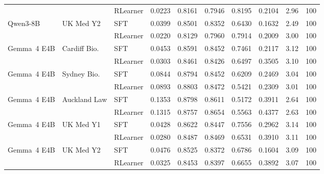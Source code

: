 \begin{table}[h]
{\begin{tabular}{lllccccccc}
 &  & RLearner & 0.0223 & 0.8161 & 0.7946 & 0.8195 & 0.2104 & 2.96 & 100 \\
Qwen3-8B & UK Med Y2 & SFT & 0.0399 & 0.8501 & 0.8352 & 0.6430 & 0.1632 & 2.49 & 100 \\
 &  & RLearner & 0.0220 & 0.8129 & 0.7960 & 0.7914 & 0.2009 & 3.00 & 100 \\
\midrule
Gemma~4 E4B & Cardiff Bio. & SFT & 0.0453 & 0.8591 & 0.8452 & 0.7461 & 0.2117 & 3.12 & 100 \\
 &  & RLearner & 0.0303 & 0.8461 & 0.8426 & 0.6497 & 0.3505 & 3.10 & 100 \\
Gemma~4 E4B & Sydney Bio. & SFT & 0.0844 & 0.8794 & 0.8452 & 0.6209 & 0.2469 & 3.04 & 100 \\
 &  & RLearner & 0.0893 & 0.8803 & 0.8472 & 0.5421 & 0.2309 & 3.01 & 100 \\
Gemma~4 E4B & Auckland Law & SFT & 0.1353 & 0.8798 & 0.8611 & 0.5172 & 0.3911 & 2.64 & 100 \\
 &  & RLearner & 0.1315 & 0.8757 & 0.8654 & 0.5563 & 0.4377 & 2.63 & 100 \\
Gemma~4 E4B & UK Med Y1 & SFT & 0.0428 & 0.8622 & 0.8447 & 0.7556 & 0.2962 & 3.14 & 100 \\
 &  & RLearner & 0.0280 & 0.8487 & 0.8469 & 0.6531 & 0.3910 & 3.11 & 100 \\
Gemma~4 E4B & UK Med Y2 & SFT & 0.0476 & 0.8525 & 0.8372 & 0.6786 & 0.1604 & 3.09 & 100 \\
 &  & RLearner & 0.0325 & 0.8453 & 0.8397 & 0.6655 & 0.3892 & 3.07 & 100 \\
\bottomrule
\end{tabular}}
\end{table}
